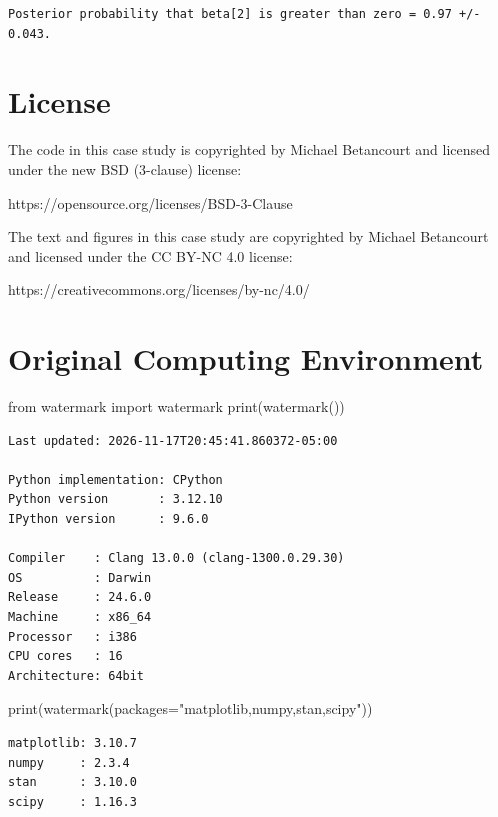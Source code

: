 \documentclass[
  letterpaper,
  DIV=11,
  numbers=noendperiod]{scrartcl}
\newenvironment{Shaded}{\begin{snugshade}}{\end{snugshade}}
\newcommand{\BuiltInTok}[1]{\textcolor[rgb]{0.00,0.23,0.31}{#1}}
\newcommand{\ImportTok}[1]{\textcolor[rgb]{0.00,0.46,0.62}{#1}}
\newcommand{\NormalTok}[1]{\textcolor[rgb]{0.00,0.23,0.31}{#1}}
\newcommand{\OperatorTok}[1]{\textcolor[rgb]{0.37,0.37,0.37}{#1}}
\newcommand{\StringTok}[1]{\textcolor[rgb]{0.13,0.47,0.30}{#1}}
\begin{document}
\begin{verbatim}
Posterior probability that beta[2] is greater than zero = 0.97 +/- 0.043.
\end{verbatim}

\section*{License}\label{license}

The code in this case study is copyrighted by Michael Betancourt and
licensed under the new BSD (3-clause) license:

https://opensource.org/licenses/BSD-3-Clause

The text and figures in this case study are copyrighted by Michael
Betancourt and licensed under the CC BY-NC 4.0 license:

https://creativecommons.org/licenses/by-nc/4.0/

\section*{Original Computing
Environment}\label{original-computing-environment}

\begin{Shaded}
\begin{Highlighting}[]
\ImportTok{from}\NormalTok{ watermark }\ImportTok{import}\NormalTok{ watermark}
\BuiltInTok{print}\NormalTok{(watermark())}
\end{Highlighting}
\end{Shaded}

\begin{verbatim}
Last updated: 2026-11-17T20:45:41.860372-05:00

Python implementation: CPython
Python version       : 3.12.10
IPython version      : 9.6.0

Compiler    : Clang 13.0.0 (clang-1300.0.29.30)
OS          : Darwin
Release     : 24.6.0
Machine     : x86_64
Processor   : i386
CPU cores   : 16
Architecture: 64bit
\end{verbatim}

\begin{Shaded}
\begin{Highlighting}[]
\BuiltInTok{print}\NormalTok{(watermark(packages}\OperatorTok{=}\StringTok{"matplotlib,numpy,stan,scipy"}\NormalTok{))}
\end{Highlighting}
\end{Shaded}

\begin{verbatim}
matplotlib: 3.10.7
numpy     : 2.3.4
stan      : 3.10.0
scipy     : 1.16.3
\end{verbatim}
\end{document}
